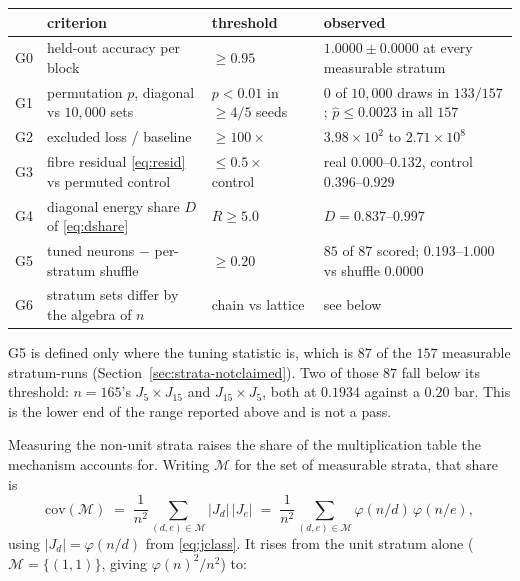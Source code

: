 \begin{center}
\small
\begin{tabular}{l p{} l p{}}
  \toprule
  & criterion & threshold & observed \\
  \midrule
  G0 & held-out accuracy per block & $\ge 0.95$ & $1.0000 \pm 0.0000$ at every measurable stratum \\
  G1 & permutation $p$, diagonal vs $10{,}000$ sets & $p < 0.01$ in $\ge 4/5$ seeds & $0$ of $10{,}000$ draws in $133/157$; $\hat{p} \le 0.0023$ in all $157$ \\
  G2 & excluded loss / baseline & $\ge 100\times$ & $3.98 \times 10^{2}$ to $2.71 \times 10^{8}$ \\
  G3 & fibre residual \eqref{eq:resid} vs permuted control & $\le 0.5 \times$ control & real $0.000$--$0.132$, control $0.396$--$0.929$ \\
  G4 & diagonal energy share $D$ of \eqref{eq:dshare} & $R \ge 5.0$ & $D = 0.837$--$0.997$ \\
  G5 & tuned neurons $-$ per-stratum shuffle & $\ge 0.20$ & $85$ of $87$ scored; $0.193$--$1.000$ vs shuffle $0.0000$ \\
  G6 & stratum sets differ by the algebra of $n$ & chain vs lattice & see below \\
  \bottomrule
\end{tabular}
\end{center}

G5 is defined only where the tuning statistic is, which is $87$ of the $157$ measurable
stratum-runs (Section~\ref{sec:strata-notclaimed}). Two of those $87$ fall below its
threshold: $n = 165$'s $J_{5} \times J_{15}$ and $J_{15} \times J_{5}$, both at $0.1934$
against a $0.20$ bar. This is the lower end of the range reported above and is not a pass.

Measuring the non-unit strata raises the share of the multiplication table the mechanism
accounts for. Writing $\mathcal{M}$ for the set of measurable strata, that share is
\begin{equation}
  \label{eq:coverage}
  \mathrm{cov}(\mathcal{M}) \;=\;
  \frac{1}{n^{2}} \sum_{(d,e) \in \mathcal{M}} |J_{d}| \, |J_{e}|
  \;=\; \frac{1}{n^{2}} \sum_{(d,e) \in \mathcal{M}} \varphi(n/d)\,\varphi(n/e),
\end{equation}
using $|J_{d}| = \varphi(n/d)$ from \eqref{eq:jclass}. It rises from the unit stratum alone
($\mathcal{M} = \{(1,1)\}$, giving $\varphi(n)^{2}/n^{2}$) to:

